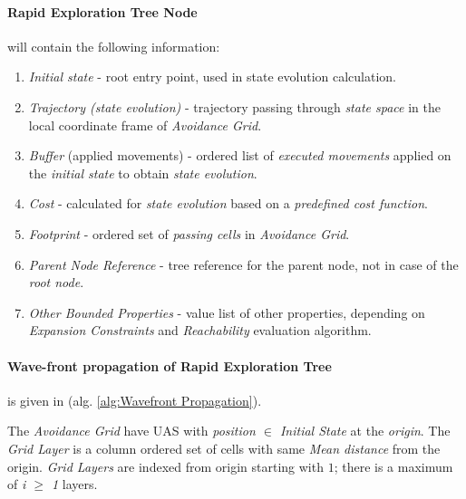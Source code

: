 \paragraph{Rapid Exploration Tree Node} will contain the following information:
\begin{enumerate}
    \item \emph{Initial state} - root entry point, used in state evolution calculation.
    
    \item \emph{Trajectory (state evolution)} - trajectory passing through \emph{state space} in the local coordinate frame of \emph{Avoidance Grid}.
    
    \item \emph{Buffer} (applied movements) - ordered list of \emph{executed movements} applied on the \emph{initial state} to obtain \emph{state evolution}.
    
    \item \emph{Cost} - calculated for \emph{state evolution} based on a \emph{predefined cost function}. 
    
    \item \emph{Footprint} - ordered set of \emph{passing cells} in \emph{Avoidance Grid}.
    
    \item \emph{Parent Node Reference} - tree reference for the parent node, not in case of the \emph{root node}.
    
    \item \emph{Other Bounded Properties} - value list of other properties, depending on \emph{Expansion Constraints} and \emph{Reachability} evaluation algorithm.
\end{enumerate}

\paragraph{Wave-front propagation of Rapid Exploration Tree} is given in (alg. \ref{alg:Wavefront Propagation}). 

The \emph{Avoidance Grid} have UAS with \emph{position $\in$ Initial State} at the \emph{origin}. The \emph{Grid Layer} is a column ordered set of cells with same \emph{Mean distance} from the origin. \emph{Grid Layers} are indexed from origin starting with $1$; there is a maximum of \emph{i $\ge$ 1} layers.

